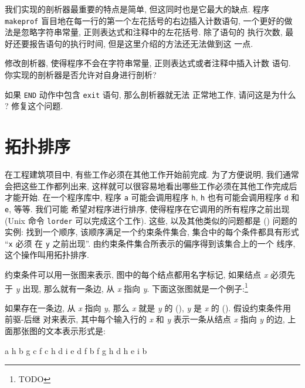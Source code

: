 我们实现的剖析器最重要的特点是简单, 但这同时也是它最大的缺点. 程序 
\texttt{makeprof} 盲目地在每一行的第一个左花括号的右边插入计数语句,
一个更好的做法是忽略字符串常量, 正则表达式和注释中的左花括号. 除了语句的
执行次数, 最好还要报告语句的执行时间, 但是这里介绍的方法还无法做到这
一点.

\begin{exercise}
    修改剖析器, 使得程序不会在字符串常量, 正则表达式或者注释中插入计数
    语句. 你实现的剖析器是否允许对自身进行剖析?
\end{exercise}

\begin{exercise}
    如果 \texttt{END} 动作中包含 \texttt{exit} 语句, 那么剖析器就无法
    正常地工作, 请问这是为什么 ? 修复这个问题.
\end{exercise}

\section{拓扑排序}
\label{sec:topological_sorting}

在工程建筑项目中, 有些工作必须在其他工作开始前完成. 为了方便说明, 我们通常
会把这些工作都列出来, 这样就可以很容易地看出哪些工作必须在其他工作完成后
才能开始. 在一个程序库中, 程序 \texttt{a} 可能会调用程序 \texttt{h},
\texttt{h} 也有可能会调用程序 \texttt{d}  和 \texttt{e}, 等等. 我们可能
希望对程序进行排序, 使得程序在它调用的所有程序之前出现 (Unix 命令
\texttt{lorder} 可以完成这个工作). 这些, 以及其他类似的问题都是
 () 问题的实例: 找到一个顺序,
该顺序满足一个约束条件集合, 集合中的每个条件都具有形式 ``\texttt{x} 必须
在 \texttt{y} 之前出现''. 由约束条件集合所表示的偏序得到该集合上的一个
线序, 这个操作叫用拓扑排序.

约束条件可以用一张图来表示, 图中的每个结点都用名字标记, 如果结点 \textit{x}
必须先于 \textit{y} 出现, 那么就有一条边, 从 \textit{x} 指向 \textit{y}.
下面这张图就是一个例子:\footnote{TODO}

如果存在一条边, 从 \textit{x} 指向 \textit{y}, 那么 \textit{x} 就是
\textit{y} 的  (), \textit{y} 是 \textit{x}
的  (). 假设约束条件用 前驱-后继 对来表示,
其中每个输入行的 \textit{x} 和 \textit{y} 表示一条从结点 \textit{x} 指向 
\textit{y} 的边, 上面那张图的文本表示形式是:
\begin{file}
    a   h
    b   g
    c   f
    c   h
    d   i
    e   d
    f   b
    f   g
    h   d
    h   e
    i   b
\end{file}

